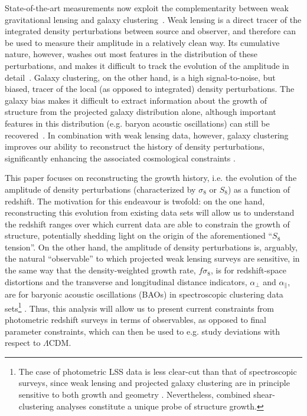 \documentclass[a4paper,11pt]{article}
\newcommand{\lcdm}{$\Lambda$CDM\xspace}
\begin{document}
    State-of-the-art measurements now exploit the complementarity between weak gravitational lensing and galaxy clustering~\cite{1708.01530,2007.15632,2105.03421}. Weak lensing is a direct tracer of the integrated density perturbations between source and observer, and therefore can be used to measure their amplitude in a relatively clean way. Its cumulative nature, however, washes out most features in the distribution of these perturbations, and makes it difficult to track the evolution of the amplitude in detail~\cite{astro-ph/9912508,1706.09359}. Galaxy clustering, on the other hand, is a high signal-to-noise, but biased, tracer of the local (as opposed to integrated) density perturbations. The galaxy bias makes it difficult to extract information about the growth of structure from the projected galaxy distribution alone, although important features in this distribution (e.g. baryon acoustic oscillations) can still be recovered~\cite{1705.05442, 1712.06209}. In combination with weak lensing data, however, galaxy clustering improves our ability to reconstruct the history of density perturbations, significantly enhancing the associated cosmological constraints \cite{astro-ph/9912508,1706.09359,1708.01530,1710.03235,2007.15632,2105.03421}.

    This paper focuses on reconstructing the growth history, i.e. the evolution of the amplitude of density perturbations (characterized by $\sigma_8$ or $S_8$) as a function of redshift. The motivation for this endeavour is twofold: on the one hand, reconstructing this evolution from existing data sets will allow us to understand the redshift ranges over which current data are able to constrain the growth of structure, potentially shedding light on the origin of the aforementioned ``$S_8$ tension''. On the other hand, the amplitude of density perturbations is, arguably, the natural ``observable'' to which projected weak lensing surveys are sensitive, in the same way that the density-weighted growth rate, $f\sigma_8$, is for redshift-space distortions and the transverse and longitudinal distance indicators, $\alpha_\perp$ and $\alpha_\parallel$, are for baryonic acoustic oscillations (BAOs)  in spectroscopic clustering data sets\footnote{The case of photometric LSS data is less clear-cut than that of spectroscopic surveys, since weak lensing and projected galaxy clustering are in principle sensitive to both growth and geometry \cite{2010.05924,2105.09545}. Nevertheless, combined shear-clustering analyses constitute a unique probe of structure growth.} \cite{1979Natur.281..358A,1987MNRAS.227....1K,2007.08991}. Thus, this analysis will allow us to present current constraints from photometric redshift surveys in terms of observables, as opposed to final parameter constraints, which can then be used to e.g. study deviations with respect to \lcdm.
\end{document}

